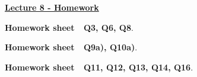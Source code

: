 \documentclass[12pt]{article} %
\begin{document}
	\renewcommand*{\coursecode}{MATH 235} %
	\renewcommand*{\assgnnumber}{Assignment 1} %
	\renewcommand*{\submdate}{September 14, 2021} %
	\renewcommand*{\studentfname}{Abdullah} %
	\renewcommand*{\studentlname}{Zubair} %
    \renewcommand*{\proofname}{Proof:}

	\renewcommand\qedsymbol{$\blacksquare$}
	\setfigpath
	\fancyhfoffset[L,O]{0pt} %




\begin{center}
	\textbf{\underline{\Huge{Lecture 8 - Homework}}}
\end{center}

\begin{qstn}
  \textbf{Homework sheet \,\, Q3, Q6, Q8}. 
\end{qstn}

\begin{qstn}
  \textbf{Homework sheet \,\, Q9a), Q10a)}. 
\end{qstn}

\begin{qstn}
  \textbf{Homework sheet \,\, Q11, Q12, Q13, Q14, Q16}. 
\end{qstn}
\end{document}

